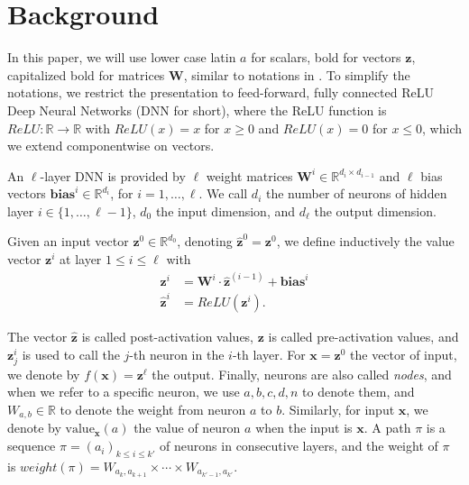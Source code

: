 \documentclass{llncs}
\newcommand{\vz}{\boldsymbol{z}}
\newcommand{\vb}{\boldsymbol{bias}}
\newcommand{\val}{{\textrm{value}}}
\begin{document}



\section{Background}

In this paper, we will use lower case latin $a$ for scalars, bold for vectors $\boldsymbol{z}$, 
capitalized bold for matrices $\boldsymbol{W}$, similar to notations in \cite{prima,crown}.
To simplify the notations, we restrict the presentation to feed-forward, 
fully connected ReLU Deep Neural Networks (DNN for short), where the ReLU function is $ReLU : \mathbb{R} \rightarrow \mathbb{R}$ with
$ReLU(x)=x$ for $x \geq 0$ and $ReLU(x)=0$ for $x \leq 0$, which we extend componentwise on vectors.




An $\ell$-layer DNN is provided by $\ell$ weight matrices 
$\boldsymbol{W}^i \in \mathbb{R}^{d_i\times d_{i-1}}$
and $\ell$ bias vectors $\vb^i \in \mathbb{R}^{d_i}$, for $i=1, \ldots, \ell$.
We call $d_i$ the number of neurons of hidden layer $i \in \{1, \ldots, \ell-1\}$,
$d_0$ the input dimension, and $d_\ell$ the output dimension.

Given an input vector $\boldsymbol{z}^0 \in \mathbb{R}^{d_0}$, 
denoting $\hat{\boldsymbol{z}}^{0}={\boldsymbol{z}}^0$, we define inductively the value vector $\boldsymbol{z}^i$ at layer $1 \leq i \leq \ell$ with
\begin{align*}
	{\boldsymbol{z}}^{i} &= \boldsymbol{W}^i\cdot \hat{\boldsymbol{z}}^{(i-1)}+ \vb^i\\
	\hat{\boldsymbol{z}}^{i} &= ReLU({\boldsymbol{z}}^i).
\end{align*} 

The vector $\hat{\boldsymbol{z}}$ is called post-activation values, 
$\boldsymbol{z}$ is called pre-activation values, 
and $\boldsymbol{z}^{i}_j$ is used to call the $j$-th neuron in the $i$-th layer. 
For $\boldsymbol{x}=\vz^0$ the vector of input, we denote by $f(\boldsymbol{x})=\vz^\ell$ the output. Finally, neurons are also called \emph{nodes}, and when we refer to a specific neuron, we use $a,b,c,d,n$ to denote them, and $W_{a,b} \in \mathbb{R}$ to denote the weight from neuron $a$ to $b$. Similarly, for input $\boldsymbol{x}$, we denote by $\val_{\boldsymbol{x}}(a)$ the value of neuron $a$ when the input is $\boldsymbol{x}$. A path $\pi$ is a sequence $\pi=(a_i)_{k \leq  i \leq k'}$ of neurons in consecutive layers, and the weight of $\pi$ is 
$weight(\pi)=W_{a_k,a_{k+1}} \times \cdots \times  W_{a_{k'-1},a_{k'}}$.
\end{document}

